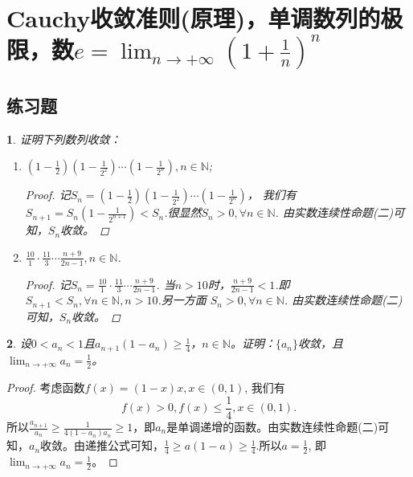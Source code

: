 \documentclass[utf8]{book}
\newtheorem{example}{}[section]             %
\begin{document}
\section{Cauchy收敛准则(原理)，单调数列的极限，数$e=\displaystyle \lim_{n\to +\infty}\left(1+\frac{1}{n}\right)^n$}
\subsection{练习题}
\begin{example}
证明下列数列收敛：
\renewcommand\labelenumi{\normalfont(\theenumi)}
\begin{enumerate}
\item $\displaystyle\left(1-\frac{1}{2}\right)\left(1-\frac{1}{2^2}\right)\cdots\left(1-\frac{1}{2^n}\right), n\in\mathbb{N}$;

\begin{proof}
记$S_n = \left(1-\frac{1}{2}\right)\left(1-\frac{1}{2^2}\right)\cdots\left(1-\frac{1}{2^n}\right)$， 我们有$S_{n+1} = S_n\left(1-\frac{1}{2^{n+1}}\right) < 
S_n$.很显然$S_n > 0,\forall n\in\mathbb{N}$. 由实数连续性命题(二)可知，$S_n$收敛。
\end{proof}

\item $\displaystyle\frac{10}{1}\cdot\frac{11}{3}\cdots\frac{n+9}{2n-1}, n\in\mathbb{N}$.

\begin{proof}
记$S_n = \frac{10}{1}\cdot\frac{11}{3}\cdots\frac{n+9}{2n-1}$. 当$n>10$时，$\frac{n+9}{2n-1} < 1$.即$S_{n+1} < S_{n},\forall n \in \mathbb{N}, n > 10$.另一方面
$S_n > 0, \forall n\in\mathbb{N}$. 由实数连续性命题(二)可知，$S_n$收敛。
\end{proof}
\end{enumerate}
\end{example}
\begin{example}
设$0<a_n<1$且$a_{n+1}(1-a_n)\geq \frac{1}{4}$，$n\in\mathbb{N}$。证明：$\{a_n\}$收敛，且$\displaystyle \lim_{n\to +\infty}a_n = \frac{1}{2}$。
\end{example}
\begin{proof}
考虑函数$f(x) = (1-x)x, x\in (0,1)$, 我们有$$f(x) > 0, f(x) \leq \frac{1}{4}, x\in (0,1).$$
所以$\displaystyle\frac{a_{n+1}}{a_n} \geq \frac{1}{4(1-a_n)a_n} \geq 1$，即$a_n$是单调递增的函数。由实数连续性命题(二)可知，$a_n$收敛。由递推公式可知，$\frac{1}{4}\geq a(1-a)\geq \frac{1}{4}$.所以$a=\frac{1}{2}$, 即$\displaystyle \lim_{n\to +\infty}a_n = \frac{1}{2}$。
\end{proof}
\end{document}
